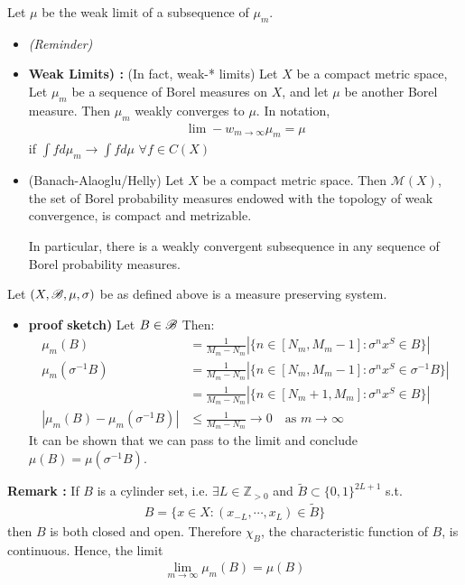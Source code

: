 \documentclass[10pt,a4paper]{report}
\begin{document}
Let $\mu$ be the weak limit of a subsequence of $\mu_m$.
\s

\begin{itemize}
\item[ ] \textsl{(Reminder)}

\item \textbf{Weak Limits) : }(In fact, weak-* limits) Let $X$ be a compact metric space, Let $\mu_m$ be a sequence of Borel measures on $X$, and let $\mu$ be another Borel measure. Then $\mu_m$ weakly converges to $\mu$. In notation,
\begin{align*}
\lim-w_{m\rightarrow \infty} \mu_m = \mu
\end{align*}
if $\int f d\mu_m \rightarrow \int f d\mu$ $\forall f\in C(X)$

\item \thm (Banach-Alaoglu/Helly) Let $X$ be a compact metric space. Then $\mathscr{M}(X)$, the set of Borel probability measures endowed with the topology of weak convergence, is compact and metrizable.

In particular, there is a weakly convergent subsequence in any sequence of Borel probability measures.
\end{itemize}
\s

\lem Let $(X,\mathscr{B}, \mu, \sigma)$ be as defined above is a measure preserving system.
\begin{itemize}
\item[ ] \textbf{proof sketch)} Let $B\in \mathscr{B}$ Then:
\begin{align*}
\mu_m(B) &= \frac{1}{M_m-N_m} |\{ n \in [N_m, M_m-1] : \sigma^n x^S \in B \}  | \\
\mu_m(\sigma^{-1}B) &= \frac{1}{M_m-N_m} | \{n\in [N_m, M_m -1]:\sigma^n x^S \in \sigma^{-1} B \} | \\
&= \frac{1}{M_m-N_m} | \{n\in [N_m +1, M_m]:\sigma^n x^S \in B \} | \\
|\mu_m(B) - \mu_m(\sigma^{-1}B)| &\leq \frac{1}{M_m-N_m} \rightarrow 0 \quad \text{as } m\rightarrow \infty
\end{align*} 
It can be shown that we can pass to the limit and conclude $\mu (B) = \mu(\sigma^{-1}B)$.
\end{itemize}
\s

\bull \textbf{Remark :} If $B$ is a cylinder set, i.e. $\exists L \in \mathbb{Z}_{>0}$ and $\tilde{B} \subset \{0,1\}^{2L+1}$ s.t.
\begin{align*}
B = \{ x\in X : (x_{-L},\cdots,x_L) \in \tilde{B} \}
\end{align*}
then $B$ is both closed and open. Therefore $\chi_B$, the characteristic function of $B$, is continuous. Hence, the limit
\begin{align*}
\lim_{m\rightarrow \infty} \mu_m(B) = \mu(B)
\end{align*}
\s
\end{document}
